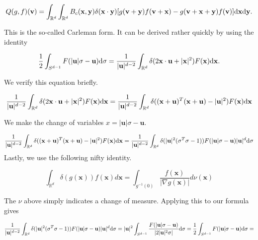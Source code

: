 \documentclass{article}
\def\t{\text}
\def\b{\mathbf}
\begin{document}
\begin{equation*} \label{eq:Carleman}
    Q(g,f)(\b v) = \int_{\mathbb{R}^d} \int_{\mathbb{R}^d} B_c(\b x, \b y) \delta( \b x \cdot \b y)[g(\b v + \b y) f(\b v + \b x) - g(\b v + \b x + \b y) f(\b v)] \t d \b x \t d \b y.
\end{equation*}

This is the so-called Carleman form. It can be derived rather quickly by using the identity

\[\frac{1}{2} \int_{S^{d-1}} F(| \b u| \sigma - \b u) \t d \sigma = \frac{1}{| \b u |^{d-2}} \int_{\mathbb{R}^d}\delta(2 \b x \cdot \b u + | \b x |^2) F(\b x) \t d \b x.
\]

We verify this equation briefly.

\begin{gather*}
    \frac{1}{| \b u |^{d-2}} \int_{\mathbb{R}^d} \delta(2 \b x \cdot \b u + | \b x |^2) F(\b x) \t d \b x = \frac{1}{| \b u |^{d-2}} \int_{\mathbb{R}^d} \delta((\b x + \b u)^T(\b x + \b u) - | \b u |^2) F(\b x) \t d \b x 
\end{gather*}

We make the change of variables $x = | \b u | \sigma - \b u$.

\begin{gather*}
    \frac{1}{| \b u |^{d-2}} \int_{\mathbb{R}^d} \delta((\b x + \b u)^T(\b x + \b u) - | \b u |^2) F(\b x) \t d \b x =
    \frac{1}{| \b u |^{d-2}} \int_{\mathbb{R}^d} \delta(|\b u |^2 (\sigma ^T \sigma - 1)) F(| \b u | \sigma - \b u) | \b u | ^ d \t d \b \sigma
\end{gather*}
Lastly, we use the following nifty identity.

\[
    \int_{\mathbb{R}^d} \delta(g(\b x)) f(\b x) d \b x = \int_{g^{-1}(0)} \frac{f(\b x)}{| \nabla g( \b x) |} d \nu(\b x)
\]

The $\nu$ above simply indicates a change of measure. Applying this to our formula gives 

\begin{gather*}
    \frac{1}{| \b u |^{d-2}} \int_{\mathbb{R}^d} \delta(|\b u |^2 (\sigma ^T \sigma - 1)) F(| \b u | \sigma - \b u) | \b u | ^ d \t d \b \sigma = 
    | \b u | ^ 2 \int_{S^{d-1}} \frac{F(| \b u | \sigma - \b u)}{|2 | \b u |^2 \sigma |} \t d \b \sigma = 
    \frac{1}{2} \int_{S^{d-1}} F(| \b u | \sigma - \b u) \t d \b \sigma = 
\end{gather*}
\end{document}

